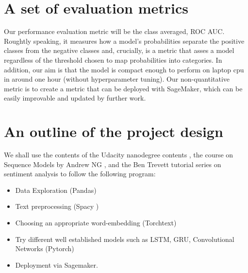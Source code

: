 \documentclass[book,preprintnumbers,11pt]{article}
\begin{document}
\section{A set of evaluation metrics}

Our performance evaluation metric will be the class averaged, ROC AUC. Roughtly speaking, it measures 
how a model's probabilities separate the positive classes  from the negative classes and, crucially,
is a metric that asses a model regardless of the threshold chosen to map probabilities into categories. In addition, our aim 
is that the model is compact enough to perform on laptop cpu in around one hour (without hyperparameter tuning). 
Our non-quantitative metric is to create a metric that can be deployed with SageMaker, which can be easily improvable and updated by further work.


\section{An outline of the project design}

We shall use the contents of the Udacity nanodegree contents \cite{ND}, 
the course on Sequence Models by Andrew NG \cite{NG}, and the 
Ben Trevett tutorial  series on sentiment analysis \cite{BT} to follow the following program:
\begin{itemize}
\item Data Exploration (Pandas)
\item Text preprocessing (Spacy \cite{Spacy})
\item Choosing an appropriate word-embedding (Torchtext)
\item Try different well established models such as LSTM, GRU, Convolutional Networks (Pytorch)
\item Deployment via Sagemaker.
\end{itemize}



\end{document}

